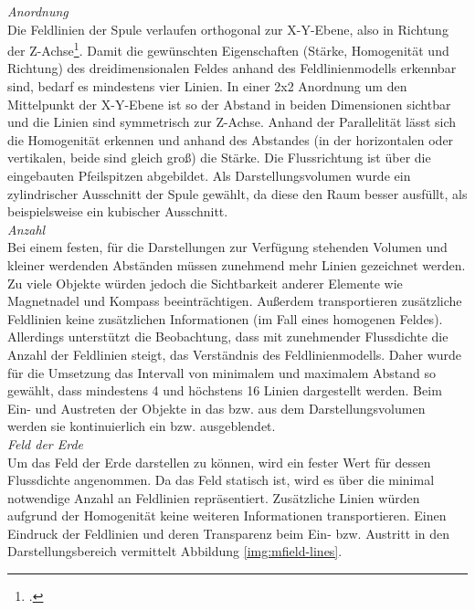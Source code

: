 \textit{Anordnung}\\
Die Feldlinien der Spule verlaufen orthogonal zur X-Y-Ebene, also in Richtung der Z-Achse\footcite{Die Z-Achse entspricht der Achse des Zylinders, der durch die beiden Spulenteile aufgespannt wird.}. Damit die gewünschten Eigenschaften (Stärke, Homogenität und Richtung) des dreidimensionalen Feldes anhand des Feldlinienmodells erkennbar sind, bedarf es mindestens vier Linien. In einer 2x2 Anordnung um den Mittelpunkt der X-Y-Ebene ist so der Abstand in beiden Dimensionen sichtbar und die Linien sind symmetrisch zur Z-Achse. Anhand der Parallelität lässt sich die Homogenität erkennen und anhand des Abstandes (in der horizontalen oder vertikalen, beide sind gleich groß) die Stärke. Die Flussrichtung ist über die eingebauten Pfeilspitzen abgebildet. Als Darstellungsvolumen wurde ein zylindrischer Ausschnitt der Spule gewählt, da diese den Raum besser ausfüllt, als beispielsweise ein kubischer Ausschnitt.\\

\textit{Anzahl}\\
Bei einem festen, für die Darstellungen zur Verfügung stehenden Volumen und kleiner werdenden Abständen müssen zunehmend mehr Linien gezeichnet werden. Zu viele Objekte würden jedoch die Sichtbarkeit anderer Elemente wie Magnetnadel und Kompass beeinträchtigen. Außerdem transportieren zusätzliche Feldlinien keine zusätzlichen Informationen (im Fall eines homogenen Feldes). Allerdings unterstützt die Beobachtung, dass mit zunehmender Flussdichte die Anzahl der Feldlinien steigt, das Verständnis des Feldlinienmodells. Daher wurde für die Umsetzung das Intervall von minimalem und maximalem Abstand so gewählt, dass mindestens 4 und höchstens 16 Linien dargestellt werden. Beim Ein- und Austreten der Objekte in das bzw. aus dem Darstellungsvolumen werden sie kontinuierlich ein bzw. ausgeblendet.\\

\textit{Feld der Erde}\\
Um das Feld der Erde darstellen zu können, wird ein fester Wert für dessen Flussdichte angenommen. Da das Feld statisch ist, wird es über die minimal notwendige Anzahl an Feldlinien repräsentiert. Zusätzliche Linien würden aufgrund der Homogenität keine weiteren Informationen transportieren. Einen Eindruck der Feldlinien und deren Transparenz beim Ein- bzw. Austritt in den Darstellungsbereich vermittelt Abbildung \ref{img:mfield-lines}.


